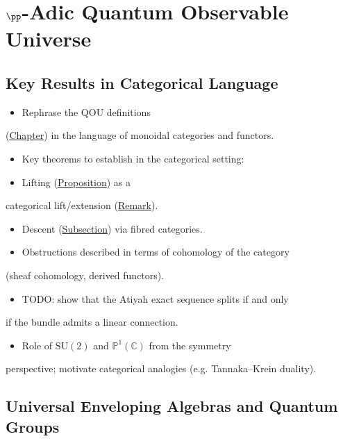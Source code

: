 \chapter{$\pp$-Adic Quantum Observable Universe}
\label{chap:p-adic}

\section{Key Results in Categorical Language}
\label{sec:categorical-reformulation}

\begin{itemize}
  \item Rephrase the QOU definitions
\end{itemize}
  (\hyperref[chap:qou]{Chapter}) in the language of monoidal categories
  and functors.
\begin{itemize}
  \item Key theorems to establish in the categorical setting:
  \item Lifting (\hyperref[prop:jet-prolongation]{Proposition}) as a
\end{itemize}
    categorical lift/extension
    (\hyperref[rem:prolongation-categorical]{Remark}).
\begin{itemize}
  \item Descent (\hyperref[ssec:descent]{Subsection}) via fibred categories.
  \item Obstructions described in terms of cohomology of the category
\end{itemize}
    (sheaf cohomology, derived functors).
\begin{itemize}
  \item TODO: show that the Atiyah exact sequence splits if and only
\end{itemize}
    if the bundle admits a linear connection.
\begin{itemize}
  \item Role of $\mathrm{SU}(2)$ and $\mathbb{P}^1(\mathbb{C})$ from the symmetry
\end{itemize}
  perspective; motivate categorical analogies
  (e.g. Tannaka--Krein duality).

\section{Universal Enveloping Algebras and Quantum Groups}
\label{sec:enveloping-algebras}

